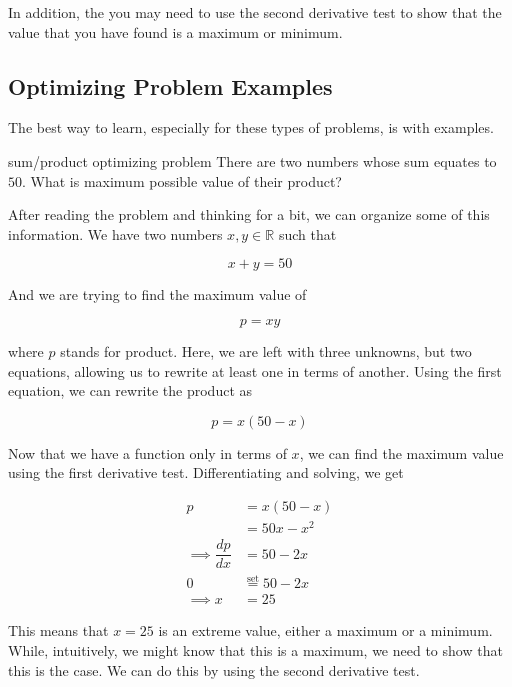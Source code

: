 In addition, the you may need to use the second derivative test to show that the value that you have found is a maximum or minimum.

\subsection{Optimizing Problem Examples}

The best way to learn, especially for these types of problems, is with examples.

\begin{examplebreak}{sum/product optimizing problem}
    There are two numbers whose sum equates to \( 50 \). What is maximum possible value of their product?
    
    \vspace{0.3cm}
    
    After reading the problem and thinking for a bit, we can organize some of this information. We have two numbers \( x, y \in \mathbb{R} \) such that
    
    \[ x + y = 50 \]
    
    And we are trying to find the maximum value of
    
    \[ p = xy \]
    
    where \( p \) stands for product. Here, we are left with three unknowns, but two equations, allowing us to rewrite at least one in terms of another. Using the first equation, we can rewrite the product as
    
    \[ p = x \left( 50 - x \right) \]
    
    Now that we have a function only in terms of \( x \), we can find the maximum value using the first derivative test. Differentiating and solving, we get
    
    \begin{align}
        p &= x \left( 50 - x \right) \\
        &= 50x - x^2 \\
        \implies \dfrac{dp}{dx} &= 50 - 2x \\
        0 &\stackrel{\text{set}}{=} 50 - 2x \\
        \implies x &= 25
    \end{align}
    
    This means that \( x = 25 \) is an extreme value, either a maximum or a minimum. While, intuitively, we might know that this is a maximum, we need to show that this is the case. We can do this by using the second derivative test.
    

\end{examplebreak}
